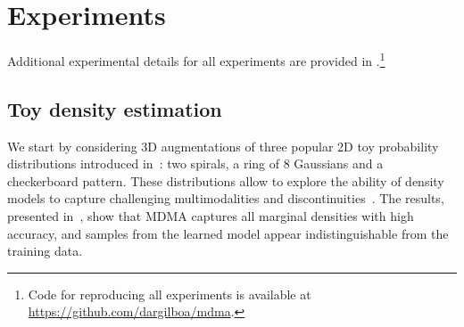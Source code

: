 \documentclass{article}
\begin{document}
%
 \section{Experiments}
Additional experimental details for all experiments are provided in .\footnote{Code for reproducing all experiments is available at \url{https://github.com/dargilboa/mdma}.}
\label{sec:experiments}


\subsection{Toy density estimation}
We start by considering  3D augmentations of three popular 2D toy probability distributions 
introduced in~\cite{grathwohl2018ffjord}: two spirals, a ring of  8 Gaussians and a checkerboard pattern. These distributions allow to explore the ability of density models
to capture challenging multimodalities and discontinuities~\cite{de2020block, huang2018neural}.
The results, presented in~, show that MDMA captures all marginal densities with high accuracy, and samples from the learned model appear indistinguishable from the training data. 
\end{document}
